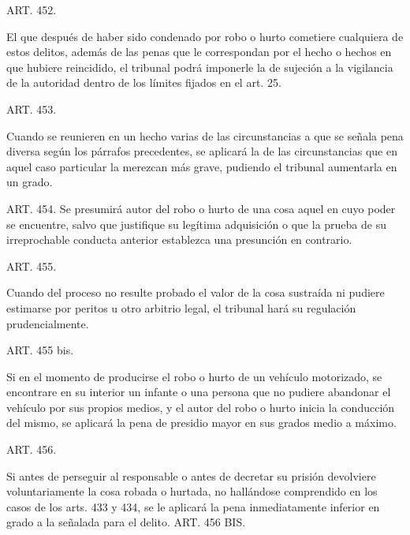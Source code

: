     ART. 452.

    El que después de haber sido condenado por robo o hurto cometiere cualquiera de estos delitos, además de las penas que le correspondan por el hecho o hechos en que hubiere reincidido, el tribunal podrá imponerle la de sujeción a la vigilancia de la autoridad dentro de los límites fijados en el art. 25.



    ART. 453.

    Cuando se reunieren en un hecho varias de las circunstancias a que se señala pena diversa según los párrafos precedentes, se aplicará la de las circunstancias que en aquel caso particular la merezcan más grave, pudiendo el tribunal aumentarla en un grado.


    ART. 454.
    Se presumirá autor del robo o hurto de una cosa aquel en cuyo poder se encuentre, salvo que justifique su legítima adquisición o que la prueba de su irreprochable conducta anterior establezca una presunción en contrario.


    ART. 455.

    Cuando del proceso no resulte probado el valor de la cosa sustraída ni pudiere estimarse por peritos u otro arbitrio legal, el tribunal hará su regulación prudencialmente.



    ART. 455 bis.

    Si en el momento de producirse el robo o hurto de un vehículo motorizado, se encontrare en su interior un infante o una persona que no pudiere abandonar el vehículo por sus propios medios, y el autor del robo o hurto inicia la conducción del mismo, se aplicará la pena de presidio mayor en sus grados medio a máximo.



    ART. 456.

    Si antes de perseguir al responsable o antes de decretar su prisión devolviere voluntariamente la cosa robada o hurtada, no hallándose comprendido en los casos de los arts. 433 y 434, se le aplicará la pena inmediatamente inferior en grado a la señalada para el delito.
    ART. 456 BIS.

